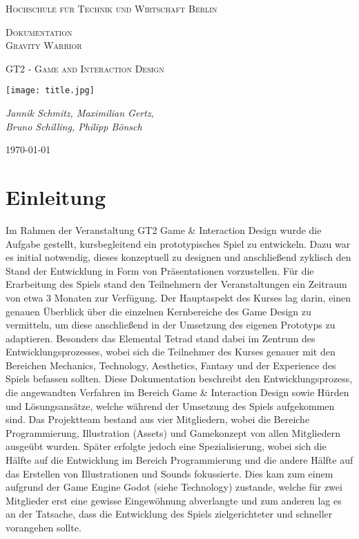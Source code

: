 \documentclass[11pt]{scrartcl}
\begin{document}
\begin{titlepage}
	\centering
	{\scshape\LARGE Hochschule für Technik und Wirtschaft Berlin \par}
	\vspace{1cm}
	{\Huge \scshape{Dokumentation\\ Gravity Warrior}\par}
	\vspace{1cm}
	{\scshape\Large GT2 - Game and Interaction Design\par}
	\vspace{2cm}
	\texttt{[image: title.jpg]}\par\vspace{1cm}
	\vspace{1cm}
	{\large\itshape Jannik Schmitz, Maximilian Gertz,\\Bruno Schilling, Philipp Bönsch\par}
	\vfill
	
	{\large \today\par}
\end{titlepage}

\lstset{basicstyle=\ttfamily\small,breaklines=true}
\newpage
\tableofcontents
\newpage
\section{Einleitung}
Im Rahmen der Veranstaltung GT2 Game \& Interaction Design wurde die Aufgabe gestellt, kursbegleitend ein prototypisches Spiel zu entwickeln. Dazu war es initial notwendig, dieses konzeptuell zu designen und anschließend zyklisch den Stand der Entwicklung in Form von Präsentationen vorzustellen. Für die Erarbeitung des Spiels stand den Teilnehmern der Veranstaltungen ein Zeitraum von etwa 3 Monaten zur Verfügung. Der Hauptaspekt des Kurses lag darin, einen genauen Überblick über die einzelnen Kernbereiche des Game Design zu vermitteln, um diese anschließend in der Umsetzung des eigenen Prototyps zu adaptieren. Besonders das Elemental Tetrad\cite[~p.41]{S2014} stand dabei im Zentrum des Entwicklungsprozesses, wobei sich die Teilnehmer des Kurses genauer mit den Bereichen Mechanics, Technology, Aesthetics, Fantasy und der Experience des Spiels befassen sollten.
Diese Dokumentation beschreibt den Entwicklungsprozess, die angewandten Verfahren im Bereich Game \& Interaction Design sowie Hürden und Lösungsansätze, welche während der Umsetzung des Spiels aufgekommen sind. Das Projektteam bestand aus vier Mitgliedern, wobei die Bereiche Programmierung, Illustration (Assets) und Gamekonzept von allen Mitgliedern ausgeübt wurden. Später erfolgte jedoch eine Spezialisierung, wobei sich die Hälfte auf die Entwicklung im Bereich Programmierung und die andere Hälfte auf das Erstellen von Illustrationen und Sounds fokussierte. Dies kam zum einem aufgrund der Game Engine Godot (siehe Technology) zustande, welche für zwei Mitglieder erst eine gewisse Eingewöhnung abverlangte und zum anderen lag es an der Tatsache, dass die Entwicklung des Spiels zielgerichteter und schneller vorangehen sollte.
\end{document}
